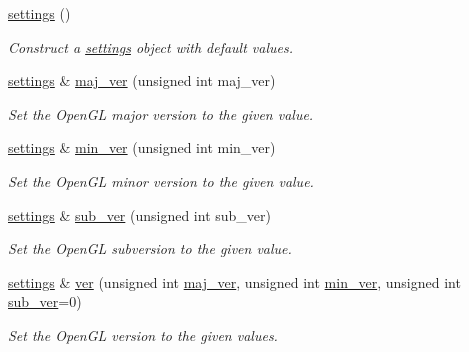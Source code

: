 \begin{DoxyCompactItemize}
\item 
\hyperlink{classgfx_1_1video__system_1_1settings_a62b87a967d92b32dfe5fa3b2d7e62a64}{settings} ()
\begin{DoxyCompactList}\small\item\em Construct a \hyperlink{classgfx_1_1video__system_1_1settings}{settings} object with default values. \end{DoxyCompactList}\item 
\hyperlink{classgfx_1_1video__system_1_1settings}{settings} \& \hyperlink{classgfx_1_1video__system_1_1settings_a10aa8cb5d2c7cccd100b9740dd61690c}{maj\-\_\-ver} (unsigned int maj\-\_\-ver)
\begin{DoxyCompactList}\small\item\em Set the Open\-G\-L major version to the given value. \end{DoxyCompactList}\item 
\hyperlink{classgfx_1_1video__system_1_1settings}{settings} \& \hyperlink{classgfx_1_1video__system_1_1settings_aab74f7109a3e20e721736895aacd8f7a}{min\-\_\-ver} (unsigned int min\-\_\-ver)
\begin{DoxyCompactList}\small\item\em Set the Open\-G\-L minor version to the given value. \end{DoxyCompactList}\item 
\hyperlink{classgfx_1_1video__system_1_1settings}{settings} \& \hyperlink{classgfx_1_1video__system_1_1settings_afba6ac346d6b69677560ffc67b8da969}{sub\-\_\-ver} (unsigned int sub\-\_\-ver)
\begin{DoxyCompactList}\small\item\em Set the Open\-G\-L subversion to the given value. \end{DoxyCompactList}\item 
\hyperlink{classgfx_1_1video__system_1_1settings}{settings} \& \hyperlink{classgfx_1_1video__system_1_1settings_a51fa05bb7b557620bc5674e1c08bd440}{ver} (unsigned int \hyperlink{classgfx_1_1video__system_1_1settings_a10aa8cb5d2c7cccd100b9740dd61690c}{maj\-\_\-ver}, unsigned int \hyperlink{classgfx_1_1video__system_1_1settings_aab74f7109a3e20e721736895aacd8f7a}{min\-\_\-ver}, unsigned int \hyperlink{classgfx_1_1video__system_1_1settings_afba6ac346d6b69677560ffc67b8da969}{sub\-\_\-ver}=0)
\begin{DoxyCompactList}\small\item\em Set the Open\-G\-L version to the given values. \end{DoxyCompactList}\item 

\end{DoxyCompactItemize}
